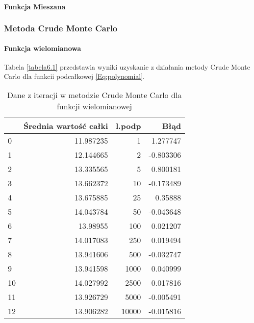 \documentclass[12pt,twoside]{article}
\begin{document}
\paragraph{Funkcja Mieszana}



\subsubsection{Metoda Crude Monte Carlo}

\paragraph{Funkcja wielomianowa}

Tabela \eqref{tabela6.1} przedstawia wyniki uzyskanie z działania metody Crude Monte Carlo dla funkcii podcałkowej \eqref{Eq:polynomial}.

\begin{table}[H]
\centering 
\caption{Dane z iteracji w metodzie Crude Monte Carlo dla funkcji wielomianowej}
\label{tabela6.1}
\begin{tabular}{lrrr}
\toprule
{} &  Średnia wartość całki &  l.podp &      Błąd \\
\midrule
0  &              11.987235 &       1 &  1.277747 \\
1  &              12.144665 &       2 & -0.803306 \\
2  &              13.335565 &       5 &  0.800181 \\
3  &              13.662372 &      10 & -0.173489 \\
4  &              13.675885 &      25 &  0.35888 \\
5  &              14.043784 &      50 & -0.043648 \\
6  &               13.98955 &     100 &  0.021207 \\
7  &              14.017083 &     250 &  0.019494 \\
8  &              13.941606 &     500 & -0.032747 \\
9  &              13.941598 &    1000 &  0.040999 \\
10 &              14.027992 &    2500 &  0.017816 \\
11 &              13.926729 &    5000 & -0.005491 \\
12 &              13.906282 &   10000 & -0.015816 \\
\bottomrule
\end{tabular}
\end{table}
\end{document}
